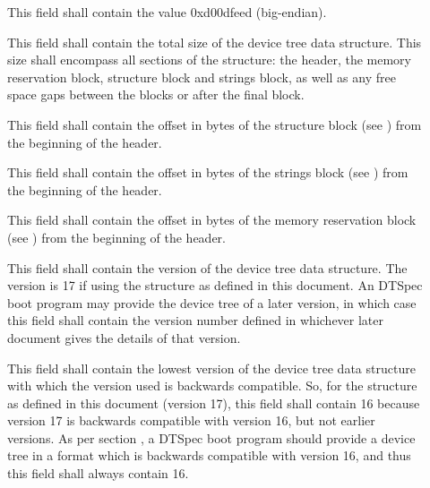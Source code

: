 \documentclass[a4paper,10pt,oneside]{sphinxmanual}
\begin{document}
\begin{description}
\item[{}] \leavevmode
This field shall contain the value 0xd00dfeed (big-endian).

\item[{}] \leavevmode
This field shall contain the total size of the device tree data
structure. This size shall encompass all sections of the structure:
the header, the memory reservation block, structure block and
strings block, as well as any free space gaps between the blocks or
after the final block.

\item[{}] \leavevmode
This field shall contain the offset in bytes of the structure block
(see {\hyperref[flattened\string-format:sect\string-fdt\string-structure\string-block]{}}) from the beginning of the header.

\item[{}] \leavevmode
This field shall contain the offset in bytes of the strings block
(see {\hyperref[flattened\string-format:sect\string-fdt\string-strings\string-block]{}}) from the beginning of the header.

\item[{}] \leavevmode
This field shall contain the offset in bytes of the memory
reservation block (see {\hyperref[flattened\string-format:sect\string-fdt\string-memory\string-reservation\string-block]{}})
from the beginning of the header.

\item[{}] \leavevmode
This field shall contain the version of the device tree data
structure. The version is 17 if using the structure as defined in
this document. An DTSpec boot program may provide the device tree of
a later version, in which case this field shall contain the version
number defined in whichever later document gives the details of that
version.

\item[{}] \leavevmode
This field shall contain the lowest version of the device tree data
structure with which the version used is backwards compatible. So,
for the structure as defined in this document (version 17), this
field shall contain 16 because version 17 is backwards compatible
with version 16, but not earlier versions. As per section
{\hyperref[flattened\string-format:sect\string-fdt\string-versioning]{}}, a DTSpec boot program should provide a
device tree in a format which is backwards compatible with version
16, and thus this field shall always contain 16.


\end{description}
\end{document}
